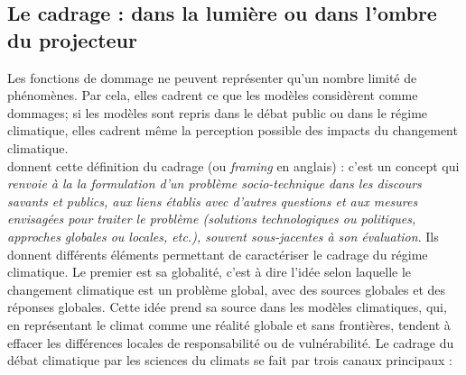 \subsection{Le cadrage : dans la lumière ou dans l'ombre du projecteur}

Les fonctions de dommage ne peuvent représenter qu'un nombre limité de phénomènes. Par cela, elles cadrent ce que les modèles considèrent comme dommages; si les modèles sont repris dans le débat public ou dans le régime climatique, elles cadrent même la perception possible des impacts du changement climatique. \\

\cite{aykut_gouverner_nodate} donnent cette définition du cadrage (ou \emph{framing} en anglais) : c'est un concept qui  \emph{renvoie à la la formulation d’un problème socio-technique dans les discours savants et publics, aux liens établis avec d’autres questions et aux mesures envisagées pour traiter le problème (solutions technologiques ou politiques, approches globales ou locales, etc.), souvent sous-jacentes à son évaluation}. Ils donnent différents éléments permettant de caractériser le cadrage du régime climatique. Le premier est sa globalité, c'est à dire l'idée selon laquelle le changement climatique est un problème global, avec des sources globales et des réponses globales. Cette idée prend sa source dans les modèles climatiques, qui, en représentant le climat comme une réalité globale et sans frontières, tendent à effacer les différences locales de responsabilité ou de vulnérabilité. Le cadrage du débat climatique par les sciences du climats se fait par trois canaux principaux : 

